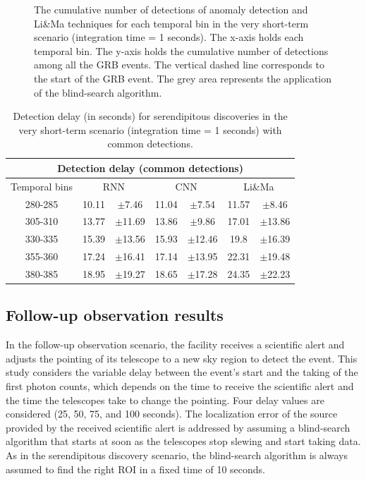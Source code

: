 \begin{figure}[!ht]
\centering

\captionsetup{width=0.9\linewidth}
\caption{The cumulative number of detections of anomaly detection and Li\&Ma techniques for each temporal bin in the very short-term scenario (integration time = 1 seconds). The x-axis holds each temporal bin. The y-axis holds the cumulative number of detections among all the GRB events. The vertical dashed line corresponds to the start of the GRB event. The grey area represents the application of the blind-search algorithm.}
\label{f:serendipitous-discoveries-itime-1}
\end{figure}

 
\begin{table}[!ht]
\centering
\begin{tabular}{|c|cc|cc|cc|} 
\hline
\multicolumn{7}{|c|}{\textbf{Detection delay} (common detections)} \\ 
\hline
\multicolumn{1}{|c|}{Temporal bins} & \multicolumn{2}{c|}{RNN} & \multicolumn{2}{c|}{CNN} & \multicolumn{2}{c|}{Li\&Ma} \\ 
\hline
280-285 & 10.11 &  $\pm$7.46 & 11.04 &  $\pm$7.54  & 11.57 &  $\pm$8.46\\
305-310 & 13.77 & $\pm$11.69 & 13.86 &  $\pm$9.86 & 17.01 & $\pm$13.86\\
330-335 & 15.39 & $\pm$13.56 & 15.93 & $\pm$12.46 & 19.8 & $\pm$16.39 \\
355-360 & 17.24 & $\pm$16.41 & 17.14 & $\pm$13.95 & 22.31 & $\pm$19.48 \\
380-385 & 18.95 & $\pm$19.27 & 18.65 & $\pm$17.28 & 24.35 &$\pm$22.23 \\
\hline
\end{tabular}
\caption{Detection delay (in seconds) for serendipitous discoveries in the very short-term scenario (integration time = 1 seconds) with common detections.}
\label{tab:dd-itime-1-common}
\end{table}




\FloatBarrier
\subsection{Follow-up observation results}
\label{s:Follow-Up-Observation-Results}
In the follow-up observation scenario, the facility receives a scientific alert and adjusts the pointing of its telescope to a new sky region to detect the event. This study considers the variable delay between the event's start and the taking of the first photon counts, which depends on the time to receive the scientific alert and the time the telescopes take to change the pointing. Four delay values are considered (25, 50, 75, and 100 seconds). 
The localization error of the source provided by the received scientific alert is addressed by assuming a blind-search algorithm that starts at soon as the telescopes stop slewing and start taking data. As in the serendipitous discovery scenario, the blind-search algorithm is always assumed to find the right ROI in a fixed time of 10 seconds.  

